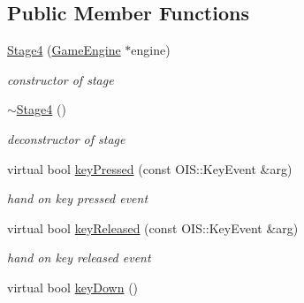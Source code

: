\subsection*{Public Member Functions}
\begin{DoxyCompactItemize}
\item 
\hypertarget{class_stage4_a88fc6e35397f5afa492966c680d7dab3}{
\hyperlink{class_stage4_a88fc6e35397f5afa492966c680d7dab3}{Stage4} (\hyperlink{class_game_engine}{GameEngine} $\ast$engine)}
\label{class_stage4_a88fc6e35397f5afa492966c680d7dab3}

\begin{DoxyCompactList}\small\item\em constructor of stage \end{DoxyCompactList}\item 
\hypertarget{class_stage4_ab6142f23e433260d6bc88f353e52e0cc}{
\hyperlink{class_stage4_ab6142f23e433260d6bc88f353e52e0cc}{$\sim$Stage4} ()}
\label{class_stage4_ab6142f23e433260d6bc88f353e52e0cc}

\begin{DoxyCompactList}\small\item\em deconstructor of stage \end{DoxyCompactList}\item 
\hypertarget{class_stage4_a43ab7f5d12f8070fda27df0eb081d98a}{
virtual bool \hyperlink{class_stage4_a43ab7f5d12f8070fda27df0eb081d98a}{keyPressed} (const OIS::KeyEvent \&arg)}
\label{class_stage4_a43ab7f5d12f8070fda27df0eb081d98a}

\begin{DoxyCompactList}\small\item\em hand on key pressed event \end{DoxyCompactList}\item 
\hypertarget{class_stage4_a167a7a6146f940aa90702e3774404795}{
virtual bool \hyperlink{class_stage4_a167a7a6146f940aa90702e3774404795}{keyReleased} (const OIS::KeyEvent \&arg)}
\label{class_stage4_a167a7a6146f940aa90702e3774404795}

\begin{DoxyCompactList}\small\item\em hand on key released event \end{DoxyCompactList}\item 
\hypertarget{class_stage4_a9040b4f45cf62e78cbbf73cfd3a770d7}{
virtual bool \hyperlink{class_stage4_a9040b4f45cf62e78cbbf73cfd3a770d7}{keyDown} ()}
\label{class_stage4_a9040b4f45cf62e78cbbf73cfd3a770d7}


\end{DoxyCompactItemize}
